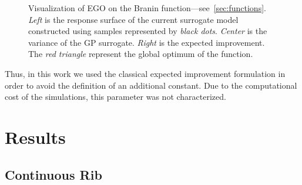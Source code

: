 \begin{figure}[!h]               
\centering
{}
   
\caption{Visualization of EGO on the Branin function---see~\cref{sec:functions}. \emph{Left} is the response surface of the current surrogate model constructed using samples represented by \emph{black dots}. \emph{Center} is the variance of the GP surrogate. \emph{Right} is the expected improvement. The \emph{red triangle} represent the global optimum of the function.}
\label{fig:branin_ego}
\end{figure}

Thus, in this work we used the classical expected improvement formulation in order to avoid the definition of an additional constant. Due to the computational cost of the simulations, this parameter was not characterized.

\section{Results}
\label{sec:optim_results}

\subsection{Continuous Rib}
\label{sec:continuous_rib}

